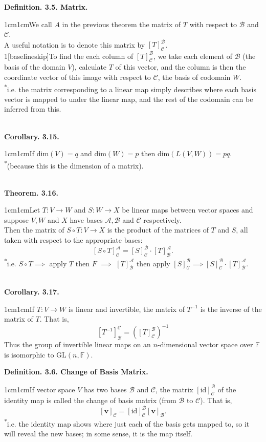\documentclass{article}
\newcommand{\vect}[1]{\mathbf{#1}}
\newcommand{\definition}[2]{\textbf{Definition. #1.}\begin{adjustwidth}{1cm}{1cm}#2\end{adjustwidth}}
\newcommand{\theorem}[2]{\textbf{Theorem. #1.}\begin{adjustwidth}{1cm}{1cm}#2\end{adjustwidth}}
\newcommand{\corollary}[2]{\textbf{Corollary. #1.}\begin{adjustwidth}{1cm}{1cm}#2\end{adjustwidth}}
\begin{document}
\definition{3.5. Matrix}{We call $A$ in the previous theorem the matrix of $T$ with respect to $\mathcal{B}$ and $\mathcal{C}$.\\A useful notation is to denote this matrix by $[T]^\mathcal{B}_\mathcal{C}$.\\1[baselineskip]To find the each column of $[T]^\mathcal{B}_\mathcal{C}$, we take each element of $\mathcal{B}$ (the basis of the domain $V$), calculate $T$ of this vector, and the column is then the coordinate vector of this image with respect to $\mathcal{C}$, the basis of codomain $W$.\\[1\baselineskip]\textsuperscript{*}i.e. the matrix corresponding to a linear map simply describes where each basis vector is mapped to under the linear map, and the rest of the codomain can be inferred from this.}~\\
\corollary{3.15}{If $\text{dim}(V) = q$ and $\text{dim}(W) = p$ then $\text{dim}(L(V,W)) = pq$.\\\textsuperscript{*}(because this is the dimension of a matrix).}~\\
\theorem{3.16}{Let $T: V \rightarrow W$ and $S: W \rightarrow X$ be linear maps between vector spaces and suppose $V, W$ and $X$ have bases $\mathcal{A}, \mathcal{B}$ and $\mathcal{C}$ respectively.\\Then the matrix of $S \circ T: V \rightarrow X$ is the product of the matrices of $T$ and $S$, all taken with respect to the appropriate bases: \[ [S \circ T]^\mathcal{A}_\mathcal{C} = [S]^\mathcal{B}_\mathcal{C} \cdot [T]^\mathcal{A}_\mathcal{B}.\]\textsuperscript{*}i.e. $S \circ T \implies $ apply $T$ then $F$ $\implies$ $[T]^\mathcal{A}_\mathcal{B}$ then apply $[S]^\mathcal{B}_\mathcal{C} \implies [S]^\mathcal{B}_\mathcal{C} \cdot [T]^\mathcal{A}_\mathcal{B}.$}~\\
\corollary{3.17}{If $T: V \rightarrow W$ is linear and invertible, the matrix of $T^{-1}$ is the inverse of the matrix of $T$. That is,\[ [T^{-1}]^\mathcal{C}_\mathcal{B} = ([T]^\mathcal{B}_\mathcal{C})^{-1} \]Thus the group of invertible linear maps on an $n$-dimensional vector space over $\mathbb{F}$ is isomorphic to $\text{GL}(n, \mathbb{F})$.}\newpage
\definition{3.6. Change of Basis Matrix}{If vector space $V$ has two bases $\mathcal{B}$ and $\mathcal{C}$, the matrix $[\text{id}]^\mathcal{B}_\mathcal{C}$ of the identity map is called the change of basis matrix (from $\mathcal{B}$ to $\mathcal{C}$). That is, \[[\vect{v}]_\mathcal{C} = [\text{id}]^\mathcal{B}_\mathcal{C}[\vect{v}]_\mathcal{B}.\]\textsuperscript{*}i.e. the identity map shows where just each of the basis gets mapped to, so it will reveal the new bases; in some sense, it is the map itself.}~\\
\end{document}
